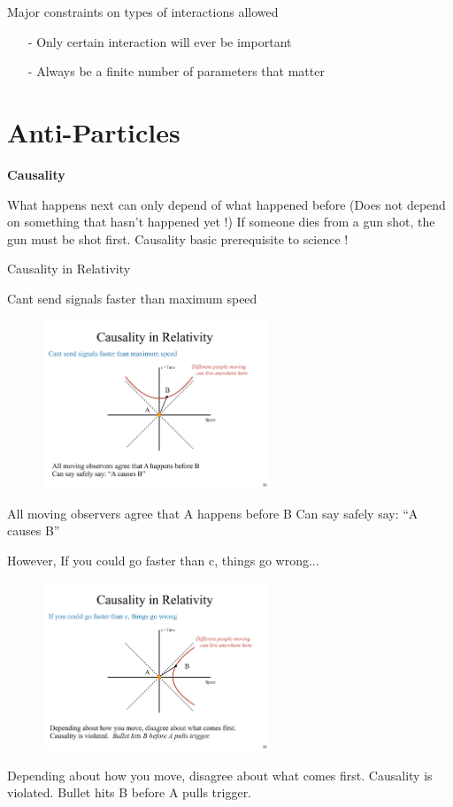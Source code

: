 Major constraints on types of interactions allowed
\begin{itemize}
\item[-] Only certain interaction will ever be important
\item[-] Always be a finite number of parameters that matter
\end{itemize}

\section{Anti-Particles}
\textbf{Causality}

What happens next can only depend of what happened before
(Does not depend on something that hasn't happened yet !)
If someone dies from a gun shot, the gun must be shot first.
Causality basic prerequisite to science !

Causality in Relativity

Cant send signals faster than maximum speed
\begin{figure}[h]
\centering
\includegraphics[width=0.6\textwidth]{./CausalityTimelike.pdf}
\end{figure}
All moving observers agree that A happens before B Can say safely say: ``A causes B''


However, If you could go faster than c, things go wrong...
\begin{figure}[h]
\centering
\includegraphics[width=0.6\textwidth]{./CausalitySpacelike.pdf}
\end{figure}
Depending about how you move, disagree about what comes first. Causality is violated. Bullet hits B before A pulls trigger.

